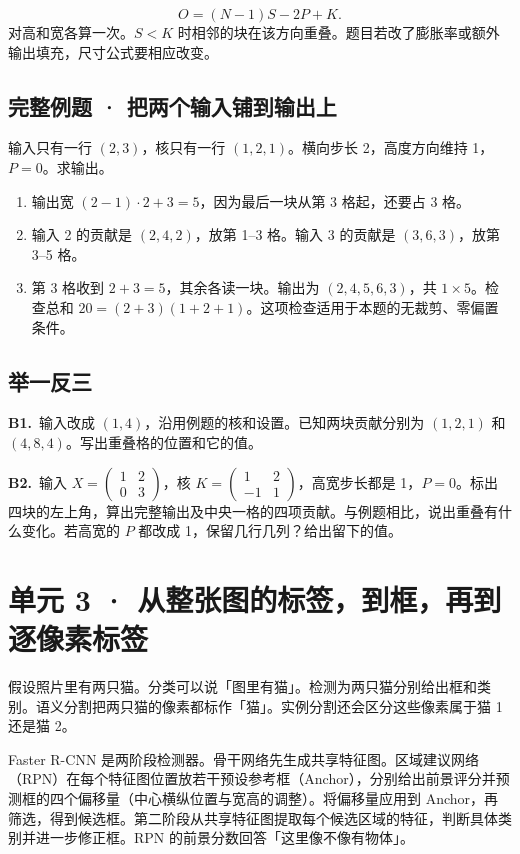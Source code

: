 \documentclass[UTF8,a4paper,11pt]{ctexart}
\newcommand{\PracticeQuestion}[3]{\par\Needspace{4\baselineskip}\noindent\begin{minipage}{\linewidth}\textbf{#1.}\ #2\par\noindent\rule{0pt}{#3mm}\par\end{minipage}\par}
\begin{document}
\[O=(N-1)S-2P+K.\]
对高和宽各算一次。$S<K$ 时相邻的块在该方向重叠。题目若改了膨胀率或额外输出填充，尺寸公式要相应改变。

\subsection{完整例题 · 把两个输入铺到输出上}
输入只有一行 $(2,3)$，核只有一行 $(1,2,1)$。横向步长 2，高度方向维持 1，$P=0$。求输出。

\begin{enumerate}
\item 输出宽 $(2-1)\cdot2+3=5$，因为最后一块从第 3 格起，还要占 3 格。
\item 输入 2 的贡献是 $(2,4,2)$，放第 1–3 格。输入 3 的贡献是 $(3,6,3)$，放第 3–5 格。
\item 第 3 格收到 $2+3=5$，其余各读一块。输出为 $(2,4,5,6,3)$，共 $1\times5$。检查总和 $20=(2+3)(1+2+1)$。这项检查适用于本题的无裁剪、零偏置条件。
\end{enumerate}
\subsection{举一反三}
\PracticeQuestion{B1}{输入改成 $(1,4)$，沿用例题的核和设置。已知两块贡献分别为 $(1,2,1)$ 和 $(4,8,4)$。写出重叠格的位置和它的值。}{24}
\PracticeQuestion{B2}{输入 $X=\begin{pmatrix}1&2\\0&3\end{pmatrix}$，核 $K=\begin{pmatrix}1&2\\-1&1\end{pmatrix}$，高宽步长都是 1，$P=0$。标出四块的左上角，算出完整输出及中央一格的四项贡献。与例题相比，说出重叠有什么变化。若高宽的 $P$ 都改成 1，保留几行几列？给出留下的值。}{34}
\clearpage
\section{单元 3 · 从整张图的标签，到框，再到逐像素标签}
假设照片里有两只猫。分类可以说「图里有猫」。检测为两只猫分别给出框和类别。语义分割把两只猫的像素都标作「猫」。实例分割还会区分这些像素属于猫 1 还是猫 2。

Faster R-CNN 是两阶段检测器。骨干网络先生成共享特征图。区域建议网络（RPN）在每个特征图位置放若干预设参考框（Anchor），分别给出前景评分并预测框的四个偏移量（中心横纵位置与宽高的调整）。将偏移量应用到 Anchor，再筛选，得到候选框。第二阶段从共享特征图提取每个候选区域的特征，判断具体类别并进一步修正框。RPN 的前景分数回答「这里像不像有物体」。
\end{document}

